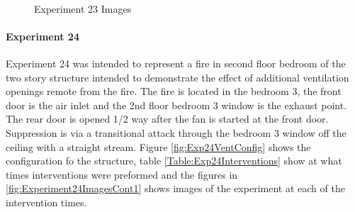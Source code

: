 \documentclass{article}
\begin{document}
\begin{figure}[H]
	\ContinuedFloat 
	\centering 
	 \ 
	\caption{Experiment 23 Images}
	\label{fig:Experiment23ImagesCont3} 
\end{figure}

\paragraph{Experiment 24}\mbox{}

Experiment 24 was intended to represent a fire in second floor bedroom of the two story structure intended to demonstrate the effect of additional ventilation openings remote from the fire. The fire is located in the bedroom 3, the front door is the air inlet and the 2nd floor bedroom 3 window is the exhaust point. The rear door is opened 1/2 way after the fan is started at the front door. Suppression is via a transitional attack through the bedroom 3 window off the ceiling with a straight stream. Figure \ref{fig:Exp24VentConfig} shows the configuration fo the structure, table \ref{Table:Exp24Interventions} show at what times interventions were preformed and the figures in \ref{fig:Experiment24ImagesCont1} shows images of the experiment at each of the intervention times.
\end{document}
